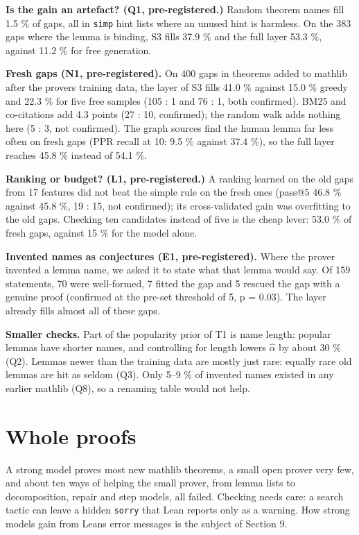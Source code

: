 \documentclass[11pt,a4paper]{article}
\begin{document}
\textbf{Is the gain an artefact? (Q1, pre-registered.)} Random theorem names fill 1.5 \% of gaps, all in \texttt{simp} hint lists where an unused hint is harmless. On the 383 gaps where the lemma is binding, S3 fills 37.9 \% and the full layer 53.3 \%, against 11.2 \% for free generation.

\textbf{Fresh gaps (N1, pre-registered).} On 400 gaps in theorems added to mathlib after the prover\textquotesingle s training data, the layer of S3 fills 41.0 \% against 15.0 \% greedy and 22.3 \% for five free samples (105 : 1 and 76 : 1, both confirmed). BM25 and co-citations add 4.3 points (27 : 10, confirmed); the random walk adds nothing here (5 : 3, not confirmed). The graph sources find the human lemma far less often on fresh gaps (PPR recall at 10: 9.5 \% against 37.4 \%), so the full layer reaches 45.8 \% instead of 54.1 \%.

\textbf{Ranking or budget? (L1, pre-registered.)} A ranking learned on the old gaps from 17 features did not beat the simple rule on the fresh ones (pass@5 46.8 \% against 45.8 \%, 19 : 15, not confirmed); its cross-validated gain was overfitting to the old gaps. Checking ten candidates instead of five is the cheap lever: 53.0 \% of fresh gaps, against 15 \% for the model alone.

\textbf{Invented names as conjectures (E1, pre-registered).} Where the prover invented a lemma name, we asked it to state what that lemma would say. Of 159 statements, 70 were well-formed, 7 fitted the gap and 5 rescued the gap with a genuine proof (confirmed at the pre-set threshold of 5, p = 0.03). The layer already fills almost all of these gaps.

\textbf{Smaller checks.} Part of the popularity prior of T1 is name length: popular lemmas have shorter names, and controlling for length lowers \(\hat\alpha\) by about 30 \% (Q2). Lemmas newer than the training data are mostly just rare: equally rare old lemmas are hit as seldom (Q3). Only 5--9 \% of invented names existed in any earlier mathlib (Q8), so a renaming table would not help.

\section{Whole proofs}

A strong model proves most new mathlib theorems, a small open prover very few, and about ten ways of helping the small prover, from lemma lists to decomposition, repair and step models, all failed. Checking needs care: a search tactic can leave a hidden \texttt{sorry} that Lean reports only as a warning. How strong models gain from Lean\textquotesingle s error messages is the subject of Section 9.
\end{document}
